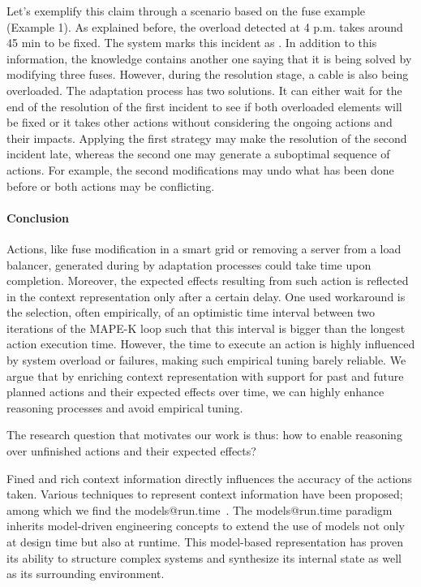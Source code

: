 Let's exemplify this claim through a scenario based on the fuse example (\cf Example 1).
As explained before, the overload detected at 4 p.m. takes around 45 min to be fixed.
The system marks this incident as .
In addition to this information, the knowledge contains another one saying that it is being solved by modifying three fuses.
However, during the resolution stage, a cable is also being overloaded.
The adaptation process has two solutions.
It can either wait for the end of the resolution of the first incident to see if both overloaded elements will be fixed or it takes other actions without considering the ongoing actions and their impacts.
Applying the first strategy may make the resolution of the second incident late, whereas the second one may generate a suboptimal sequence of actions.
For example, the second modifications may undo what has been done before or both actions may be conflicting.

\paragraph{Conclusion}
Actions, like fuse modification in a smart grid or removing a server from a load balancer, generated during by adaptation processes could take time upon completion. 
Moreover, the expected effects resulting from such action is reflected in the context representation only after a certain delay. 
One used workaround is the selection, often empirically, of an optimistic time interval between two iterations of the MAPE-K loop such that this interval is bigger than the longest action execution time.
However, the time to execute an action is highly influenced by system overload or failures, making such empirical tuning barely reliable.
We argue that by enriching context representation with support for past and future planned actions and their expected effects over time, we can highly enhance reasoning processes and avoid empirical tuning.

The research question that motivates our work is thus: how to enable reasoning over unfinished actions and their expected effects?

Fined and rich context information directly influences the accuracy of the actions taken.
Various techniques to represent context information have been proposed; among which we find the models@run.time~\cite{DBLP:journals/computer/MorinBJFS09, DBLP:journals/computer/BlairBF09}.
The models@run.time paradigm inherits model-driven engineering concepts to extend the use of models not only at design time but also at runtime. 
This model-based representation has proven its ability to structure complex systems and synthesize its internal state as well as its surrounding environment.

